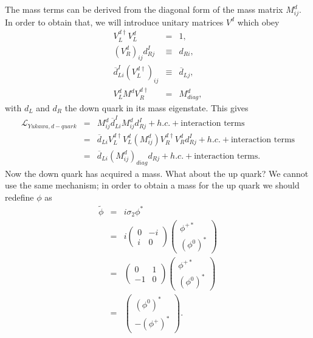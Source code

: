 The mass terms can be derived from the diagonal form of the mass matrix $M^d_{ij}$. In order to obtain that, we will introduce unitary matrices $V^d$ which obey
\begin{eqnarray}
V_L^{d\dag}V_L^d &=&  1,\\
(V^d_R)_{ij}d^I_{Rj} &\equiv& d_{Ri}, \\
\overline{d}_{Li}^I (V_L^{d\dag})_{ij} &\equiv& \overline{d}_{Lj}, \\
V^{d}_L M^d V^{d\dag}_R &=&  M^d_{diag},
\label{eqn:diagonalizingMmatrix}
\end{eqnarray}
with $d_L$ and $d_R$ the down quark in its mass eigenstate. This gives
\begin{eqnarray}
\mathcal{L}_{Yukawa,d-quark} &=& M^d_{ij}\overline{d}^I_{Li}M^d_{ij}d^I_{Rj} + h.c. + \mbox{interaction terms} \nonumber \\
&=& \overline{d}_{Li}V^{d\dag}_LV^d_L(M^d_{ij})V^{d\dag}_R V^d_Rd^I_{Rj} + h.c. + \mbox{interaction terms} \nonumber \\
&=& \overline{d}_{Li}(M^d_{ij})_{diag}d_{Rj} + h.c. + \mbox{interaction terms}.
\label{eqn:SMLYukawaDquarkMassEigenstates}
\end{eqnarray}
Now the down quark has acquired a mass. What about the up quark? We cannot use the same mechanism; in order to obtain a mass for the up quark we should redefine $\phi$ as
\begin{eqnarray}
\tilde{\phi} &=&  i\sigma_2\phi^* \nonumber \\
&=&  i \left( \begin{array}{cc} 0 & -i \\ i & 0 \end{array} \right)  \left( \begin{array}{c} \phi^{+*} \\ (\phi^{0})^* \end{array} \right) \nonumber \\
&=&  \left( \begin{array}{cc} 0 & 1 \\ -1 & 0 \end{array} \right)  \left( \begin{array}{c} \phi^{+*} \\ (\phi^{0})^* \end{array} \right) \nonumber \\
&=&   \left( \begin{array}{c} (\phi^0)^* \\ -(\phi^+)^* \end{array} \right).
\label{eqn:SMphitilde}
\end{eqnarray}
